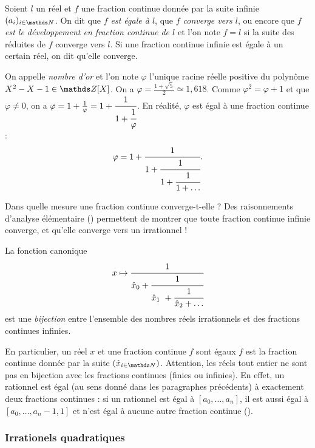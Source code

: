 \begin{definition}
	Soient $l$ un réel et $f$ une fraction continue donnée par la suite infinie
	$(a_i)_{i\in \N}$. On dit que \emph{$f$ est égale à $l$}, que \emph{$f$
	converge vers $l$}, ou encore que \emph{$f$ est le développement en
	fraction continue de $l$} et l'on note $f = l$ si la suite des réduites de
	$f$ converge vers $l$. Si une fraction continue infinie est égale à un
	certain réel, on dit qu'elle converge.
\end{definition}

\begin{exemple}[Nombre d'or]
	On appelle \emph{nombre d'or} et l'on note $\varphi$ l'unique racine réelle
	positive du polynôme $X^2 - X - 1 \in \Z[X]$. On a $\varphi =\frac{1 +
	\sqrt{5}}{2} \simeq 1, 618$. Comme $\varphi^2 = \varphi + 1$ et que
	$\varphi \neq 0$, on a $\varphi = 1 + \frac{1}{\varphi} = 1 + \cfrac{1}{1 +
	\cfrac{1}{\varphi}}$. En réalité, $\varphi$ est égal à une fraction
	continue : \[\varphi = 1 + \cfrac{1}{1 + \cfrac{1}{1 + \cfrac{1}{1 +
	\dots}}}.\]
\end{exemple}

Dans quelle mesure une fraction continue converge-t-elle ? Des raisonnements
d'analyse élémentaire () permettent de montrer que toute fraction
continue infinie converge, et qu'elle converge vers un irrationnel !

\begin{theoreme}
	La fonction canonique \[x \mapsto \cfrac{1}{\hat{x}_0 +
	\cfrac{1}{\hat{x}_1 + \cfrac{1}{\hat{x}_2 + \dots}}}\] est une
	\emph{bijection} entre l'ensemble des nombres réels irrationnels et des
	fractions continues infinies.
\end{theoreme}

En particulier, un réel $x$ et une fraction continue $f$ sont égaux \ssi $f$
est la fraction continue donnée par la suite $(\hat{x}_{i\in \N})$. Attention,
les réels tout entier ne sont pas en bijection avec les fractions continues
(finies ou infinies). En effet, un rationnel est égal (au sens donné dans les
paragraphes précédents) à exactement deux fractions continues : si un rationnel
est égal à $[a_0, \dots, a_n]$, il est aussi égal à $[a_0, \dots, a_n - 1, 1]$
et n'est égal à aucune autre fraction continue ().

\subsubsection{Irrationels quadratiques}

